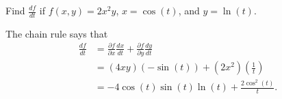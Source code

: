 \begin{activity} \label{A:10.5.1} Find $\frac{df}{dt}$ if $f(x,y) = 2x^2y$, $x=\cos(t)$, and $y=\ln(t)$.


\end{activity}
\begin{smallhint}

\end{smallhint}
\begin{bighint}

\end{bighint}
\begin{activitySolution}
The chain rule says that
\begin{align*}
\frac{df}{dt} &= \frac{\partial f}{\partial x}\frac{dx}{dt} + \frac{\partial f}{\partial y}\frac{dy}{dt} \\
	&= (4xy)\left(-\sin(t)\right) + (2x^2)\left(\frac{1}{t}\right) \\
	&= -4 \cos(t) \sin(t) \ln(t) + \frac{2\cos^2(t)}{t}.
\end{align*}
\end{activitySolution}
\aftera

